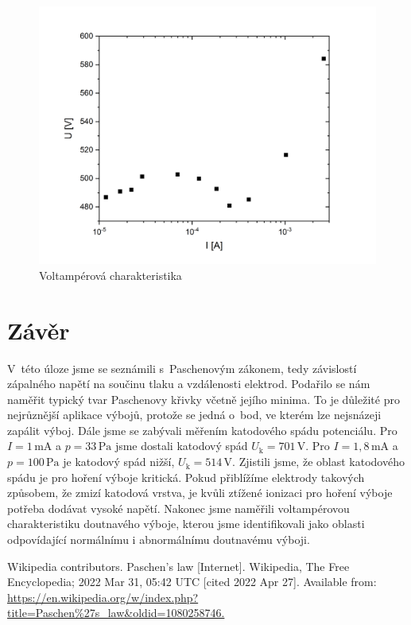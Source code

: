 \documentclass[a4paper,12pt]{article}
\begin{document}
\begin{figure}[h!]
	\centering
	\includegraphics[width=145mm]{graph1.png}
	\caption{Voltampérová charakteristika}
	\label{VAodpor}
\end{figure}

\clearpage
\section{Závěr}
V~této úloze jsme se seznámili s~Paschenovým zákonem, tedy závislostí zápalného 
napětí na součinu tlaku a vzdálenosti elektrod. Podařilo se nám naměřit typický 
tvar Paschenovy křivky včetně jejího minima. To je důležité pro nejrůznější 
aplikace výbojů, protože se jedná o~bod, ve kterém lze nejsnázeji zapálit výboj.
Dále jsme se zabývali měřením katodového spádu potenciálu. Pro 
$I = 1\,\si{\milli\ampere}$ a $p = 33\,\si{\pascal}$ jsme dostali katodový spád 
$U_\text{k} = 701\,\si{\volt}$. Pro $I = 1,8\,\si{\milli\ampere}$ a $p = 
100\,\si{\pascal}$ je katodový spád nižší,  $U_\text{k} = 514\,\si{\volt}$. 
Zjistili jsme, že oblast katodového spádu je pro hoření výboje kritická. Pokud 
přiblížíme elektrody takových způsobem, že zmizí katodová vrstva, je kvůli 
ztížené ionizaci pro hoření výboje potřeba dodávat vysoké napětí. Nakonec jsme 
naměřili voltampérovou charakteristiku doutnavého výboje, kterou jsme 
identifikovali jako oblasti odpovídající normálnímu i abnormálnímu doutnavému 
výboji.

\begin{thebibliography}{10}
	Wikipedia contributors. Paschen's law [Internet]. Wikipedia, The Free 
	Encyclopedia; 2022 Mar 31, 05:42 UTC [cited 2022 Apr 27]. Available from: 
	\url{https://en.wikipedia.org/w/index.php?title=Paschen%27s_law&oldid=1080258746.}

\end{thebibliography}
\end{document}
